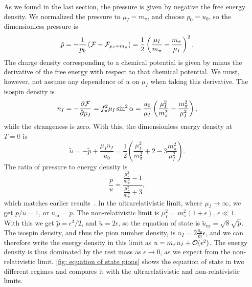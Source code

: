 As we found in the last section, the pressure is given by negative the free energy density. 
We normalized the pressure to $\mu_I = m_\pi$, and choose $p_0 = u_0$, so the dimensionless pressure is
%
\begin{equation}
    \label{pressure leading order chpt}
    \tilde p = -\frac{1}{p_0} \left(\mathcal{F} - \mathcal{F}_{\mu_I=m_\pi}\right) 
    = \frac{1}{2} \left(\frac{\mu_I}{m_\pi} - \frac{m_\pi}{\mu_I}\right)^2.
\end{equation}
%
The charge density corresponding to a chemical potential is given by minus the derivative of the free energy with respect to that chemical potential. 
We must, however, not assume any dependence of $\alpha$ on $\mu_I$ when taking this derivative.
The isospin density is
%
\begin{equation}
    \label{isospin density}
    n_I = -\pdv{\mathcal{F}}{\mu_I} = f_\pi^2 \mu_I \sin^2 \alpha 
    = 
    \frac{u_0}{\mu_I} \left(\frac{\mu_I^2}{m_\pi^2} - \frac{m_\pi^2}{\mu_I^2}\right),
\end{equation}
%
while the strangeness is zero.
With this, the dimensionless energy density at $T = 0$ is
%
\begin{equation}
    \label{energy density leading order chpt}
    \tilde u = - \tilde p + \frac{\mu_I n_I}{u_0}
    = \frac{1}{2} \left(\frac{\mu_I^2}{m_\pi^2} + 2 - 3\frac{m_\pi^2}{\mu_I^2}\right).
\end{equation}
%
The ratio of pressure to energy density is
%
\begin{equation} 
    \label{pressure energy ratio leading order chpt}
    \frac{p}{u} = \frac{\frac{\mu_I^2}{m_\pi^2} - 1}{\frac{\mu_I^2}{m_\pi^2}+3},
\end{equation}
%
which matches earlier results~\autocite{sonQCDFiniteIsospin2001}.
In the ultrarelativistic limit, where $\mu_I \rightarrow \infty$, we get $p / u = 1$, or $u_\text{ur} = p$.
The non-relativistic limit is $\mu_I^2 = m_\pi^2(1 + \epsilon)$, $\epsilon \ll 1$.
With this we get $\tilde p = \epsilon^2 / 2 $, and $\tilde u = 2\epsilon$, so the equation of state is $\tilde u_\text{nr} = \sqrt 8 \sqrt{\tilde p}$.
The isospin density, and thus the pion number density, is $n_I = 2 \frac{u_0}{\bar m} \epsilon$, and we can therefore write the energy density in this limit as $u = m _\pi n_I + \mathcal O(\epsilon^2)$.
The energy density is thus dominated by the rest mass as $\epsilon \rightarrow 0$, as we expect from the non-relativistic limit.
\autoref{fig: equation of state pions} shows the equation of state in two different regimes and compares it with the ultrarelativistic and non-relativistic limits.

